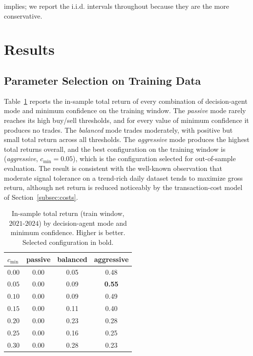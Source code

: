 \documentclass{ieeeaccess}
\newcommand{\BestMinConf}{\ensuremath{0.05}}
\begin{document}
implies; we report the i.i.d. intervals throughout because they are the more conservative.

\section{Results}
\label{sec:results}

\subsection{Parameter Selection on Training Data}

Table~\ref{tab:grid_train} reports the in-sample total return of every combination of decision-agent mode and minimum confidence on the training window. The \emph{passive} mode rarely reaches its high buy/sell thresholds, and for every value of minimum confidence it produces no trades. The \emph{balanced} mode trades moderately, with positive but small total return across all thresholds. The \emph{aggressive} mode produces the highest total returns overall, and the best configuration on the training window is (\emph{aggressive}, $c_{\min} = \BestMinConf{}$), which is the configuration selected for out-of-sample evaluation. The result is consistent with the well-known observation that moderate signal tolerance on a trend-rich daily dataset tends to maximize gross return, although net return is reduced noticeably by the transaction-cost model of Section~\ref{subsec:costs}.

\begin{table}[t]
\centering
\caption{In-sample total return (train window, $2021$-$2024$) by decision-agent mode and minimum confidence. Higher is better. Selected configuration in bold.}
\label{tab:grid_train}
\begin{tabular}{lccc}
\toprule
$c_{\min}$ & passive & balanced & aggressive \\
\midrule
$0.00$ & 0.00 & 0.05 & 0.48 \\
$0.05$ & 0.00 & 0.09 & \textbf{0.55} \\
$0.10$ & 0.00 & 0.09 & 0.49 \\
$0.15$ & 0.00 & 0.11 & 0.40 \\
$0.20$ & 0.00 & 0.23 & 0.28 \\
$0.25$ & 0.00 & 0.16 & 0.25 \\
$0.30$ & 0.00 & 0.28 & 0.23 \\
\bottomrule
\end{tabular}
\end{table}
\end{document}
